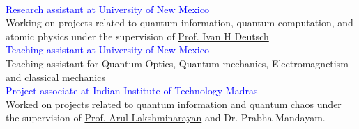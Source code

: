 \documentclass[14pt]{moderncv}
\begin{document}
\vspace{.1 in}
\\


\begin{minipage}{0.12 \textwidth} 
\end{minipage}
\begin{minipage}{0.88\textwidth}
\textcolor{blue}{Research assistant at University of New Mexico}\\
Working on projects related to quantum information, quantum computation, and atomic physics under the supervision of \href{https://cquic.unm.edu/research/research-groups/deutsch-research-group/index.html}{Prof. Ivan H Deutsch}
\\

\textcolor{blue}{Teaching assistant at University of New Mexico}\\
Teaching assistant for  Quantum Optics, Quantum mechanics, Electromagnetism and classical mechanics\\

\textcolor{blue}{Project associate at Indian Institute of Technology Madras }\\
Worked on projects related to quantum information and quantum chaos under the supervision of  \href{https://sites.google.com/view/arulakshminarayan/home}{Prof. Arul Lakshminarayan} and Dr. Prabha Mandayam.
\end{minipage}\\\\
\newpage
{}\\
\end{document}

